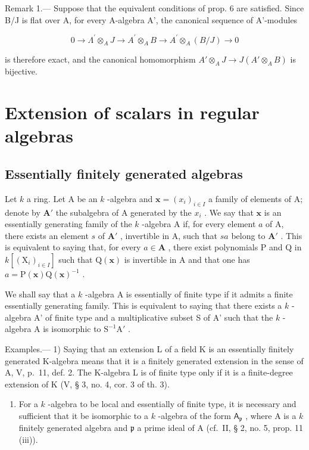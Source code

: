 Remark 1.--- Suppose that the equivalent conditions of prop. 6 are satisfied. Since B/J is flat over A, for every A-algebra A', the canonical sequence of A'-modules

\[
0 \rightarrow \Lambda^ {\prime} \otimes_ {A} J \longrightarrow A ^ {\prime} \otimes_ {A} B \longrightarrow A ^ {\prime} \otimes_ {A} (B / J) \rightarrow 0
\]

is therefore exact, and the canonical homomorphism \(A'\otimes_A J \longrightarrow J(A'\otimes_A B)\) is bijective.

\section{Extension of scalars in regular algebras}

\subsection{Essentially finitely generated algebras}

Let \(k\) a ring. Let A be an \(k\) -algebra and \(\mathbf{x} = (x_i)_{i \in I}\) a family of elements of A; denote by \(\mathbf{A}'\) the subalgebra of A generated by the \(x_i\) . We say that \(\mathbf{x}\) is an essentially generating family of the \(k\) -algebra A if, for every element \(a\) of A, there exists an element \(s\) of \(\mathbf{A}'\) , invertible in A, such that \(sa\) belong to \(\mathbf{A}'\) . This is equivalent to saying that, for every \(a \in \mathbf{A}\) , there exist polynomials P and Q in \(k[(\mathrm{X}_i)_{i \in I}]\) such that \(\mathrm{Q}(\mathbf{x})\) is invertible in A and that one has \(a = \mathrm{P}(\mathbf{x})\mathrm{Q}(\mathbf{x})^{-1}\) .

We shall say that a \(k\) -algebra A is essentially of finite type if it admits a finite essentially generating family. This is equivalent to saying that there exists a \(k\) -algebra A' of finite type and a multiplicative subset S of A' such that the \(k\) -algebra A is isomorphic to \(\mathrm{S}^{-1}\mathrm{A}'\) .

Examples.--- 1) Saying that an extension L of a field K is an essentially finitely generated K-algebra means that it is a finitely generated extension in the sense of A, V, p.~11, def. 2. The K-algebra L is of finite type only if it is a finite-degree extension of K (V, § 3, no. 4, cor. 3 of th. 3).

\begin{enumerate}
\def\labelenumi{\arabic{enumi})}
\setcounter{enumi}{1}
\tightlist
\item
  For a \(k\) -algebra to be local and essentially of finite type, it is necessary and sufficient that it be isomorphic to a \(k\) -algebra of the form \(\mathsf{A}_{\mathfrak{p}}\) , where A is a \(k\) finitely generated algebra and \(\mathfrak{p}\) a prime ideal of A (cf.~II, § 2, no. 5, prop. 11 (iii)).
\end{enumerate}

